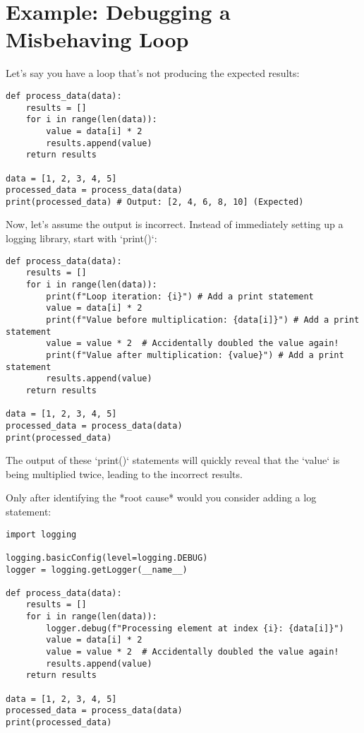 \documentclass{article}
\begin{document}
\section*{Example: Debugging a Misbehaving Loop}

Let's say you have a loop that's not producing the expected results:

\begin{verbatim}
def process_data(data):
    results = []
    for i in range(len(data)):
        value = data[i] * 2
        results.append(value)
    return results

data = [1, 2, 3, 4, 5]
processed_data = process_data(data)
print(processed_data) # Output: [2, 4, 6, 8, 10] (Expected)
\end{verbatim}

Now, let's assume the output is incorrect. Instead of immediately setting up a logging library, start with `print()`:

\begin{verbatim}
def process_data(data):
    results = []
    for i in range(len(data)):
        print(f"Loop iteration: {i}") # Add a print statement
        value = data[i] * 2
        print(f"Value before multiplication: {data[i]}") # Add a print statement
        value = value * 2  # Accidentally doubled the value again!
        print(f"Value after multiplication: {value}") # Add a print statement
        results.append(value)
    return results

data = [1, 2, 3, 4, 5]
processed_data = process_data(data)
print(processed_data)
\end{verbatim}

The output of these `print()` statements will quickly reveal that the `value` is being multiplied twice, leading to the incorrect results.

Only after identifying the *root cause* would you consider adding a log statement:

\begin{verbatim}
import logging

logging.basicConfig(level=logging.DEBUG)
logger = logging.getLogger(__name__)

def process_data(data):
    results = []
    for i in range(len(data)):
        logger.debug(f"Processing element at index {i}: {data[i]}")
        value = data[i] * 2
        value = value * 2  # Accidentally doubled the value again!
        results.append(value)
    return results

data = [1, 2, 3, 4, 5]
processed_data = process_data(data)
print(processed_data)
\end{verbatim}
\end{document}

